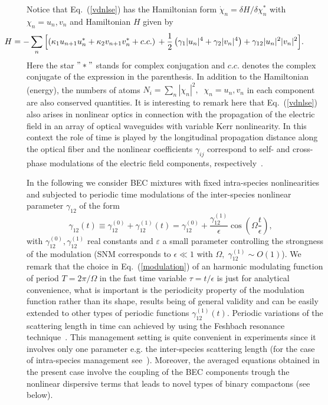 \documentclass[12pt]{iopart}
\begin{document}
Notice that Eq.~(\ref{vdnlse})  has the Hamiltonian form $\dot{\chi}_{n}=\delta H/\delta\chi_{n}^{*}$
with $\chi_{n}=u_{n},v_{n}$ and Hamiltonian $H$ given by
\begin{equation}\hskip -1.8cm
H=-\sum_{n}\Big[(\kappa_{1}u_{n+1}u_{n}^{\ast}+\kappa_{2}v_{n+1}v_{n}^{\ast}+c.c.)\,+
  \frac{1}{2}\left(\gamma_{1}|u_{n}|^{4}+\gamma_{2}|v_{n}|^{4}\right)+\gamma_{12}|u_{n}|^{2}|v_{n}|^{2}\Big].\label{HOri}
\end{equation}
Here the star $"*"$  stands for complex conjugation and $c.c.$ denotes
the complex conjugate of the expression in the parenthesis. In addition to the Hamiltonian (energy),  the numbers of atoms $N_{i}=\sum_{n}|\chi_{n}|^{2},\;\;\chi_{n}=u_{n},v_{n}$ in each component
are also conserved quantities.
It is interesting to remark here  that Eq.~(\ref{vdnlse}) also arises in nonlinear optics in connection with the propagation of the electric field in an array of optical waveguides
with variable Kerr nonlinearity. In this context the role of time
is played by the longitudinal propagation distance along the optical
fiber and the nonlinear coefficients $\gamma_{ij}$ correspond to
self- and cross-phase modulations of the electric field components,
respectively~\cite{Kobyakov,Assanto}.

In the following we consider BEC mixtures with fixed intra-species nonlinearities and
subjected to periodic time modulations of the inter-species  nonlinear parameter $\gamma_{12}$
of the form
\begin{equation}
\gamma_{12}(t)\equiv\gamma_{12}^{(0)}+\gamma_{12}^{(1)}(t)=\gamma_{12}^{(0)}+\frac{\gamma_{12}^{(1)}}{\epsilon}\cos(\Omega\frac{t}{\epsilon}),\;\;\;\ \label{modulation}
\end{equation}
with $\gamma_{12}^{(0)},\gamma_{12}^{(1)}$ real constants and $\varepsilon$
a small parameter controlling the strongness of the modulation (SNM  corresponds to $\epsilon\ll1$ with $\Omega,\;\gamma_{12}^{(1)}\sim O(1)$).
We remark that the choice in Eq.~(\ref{modulation}) of an harmonic
modulating function of period $T=2\pi/\Omega$ in the fast time variable $\tau=t/\epsilon$ is just for analytical convenience, what is important is the  periodicity property of the modulation function rather than its shape, results being of general validity and can be easily  extended to other types of periodic functions $\gamma_{12}^{(1)}(t)$. Periodic variations of the scattering length in time
can achieved by using the Feshbach resonance technique~\cite{Inouye, REV-MOD-PHYS}.
This management setting is quite convenient in experiments since it
involves only one parameter e.g. the inter-species scattering length
(for the case of intra-species management see~\cite{AHSU}). Moreover,
the averaged equations obtained in the present case involve the coupling of the BEC components trough the nonlinear dispersive terms that leads
to novel types of binary compactons (see below).
\end{document}
